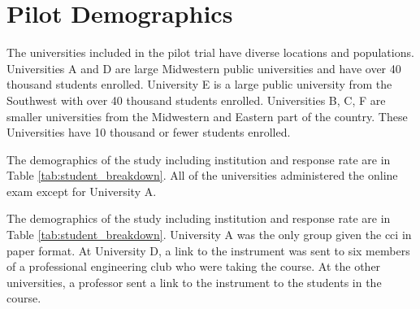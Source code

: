 \FloatBarrier
\section{Pilot Demographics}

The universities included in the pilot trial have diverse locations and populations. Universities A and D are large Midwestern public universities and have over 40 thousand students enrolled. University E is a large public university from the Southwest with over 40 thousand students enrolled. Universities B, C, F are smaller universities from the Midwestern and Eastern part of the country. These Universities have 10 thousand or fewer students enrolled.

\ifshort
The demographics of the study including institution and response rate are in Table \ref{tab:student_breakdown}. All of the universities administered the online exam except for University A. 
\fi

\iflong
The demographics of the study including institution and response rate are in Table \ref{tab:student_breakdown}. University A was the only group given the \gls{cci} in paper format. At University D, a link to the instrument was sent to six members of a professional engineering club who were taking the course. At the other universities, a professor sent a link to the instrument to the students in the course. 
\fi


\iflong
\begin{table}[!htbp]
\caption{Breakdown of Students by University}
\centering
{}

\label{tab:student_breakdown}
\end{table}
\fi

